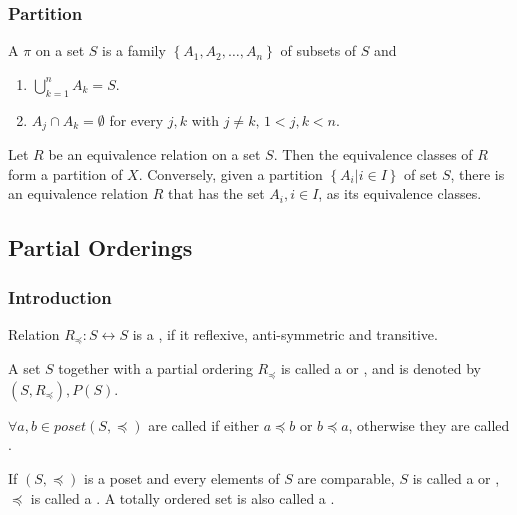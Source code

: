 \subsubsection{Partition}
\begin{definition}
    A  $\pi$ on a set $S$ is a family $\left\{ A_1,A_2,\dots,A_n \right\}$ of subsets of $S$ and 
    \begin{enumerate}
        \item $\displaystyle \bigcup_{k=1}^n A_k=S$.
        \item $\displaystyle A_j\cap A_k=\emptyset$ for every $j,k$ with $j\ne k,\, 1<j,k<n$. 
    \end{enumerate}
\end{definition}
\begin{theorem}
    Let $R$ be an equivalence relation on a set $S$. Then the equivalence classes of $R$ form a partition of $X$. Conversely, given a partition $\left\{A_i|i\in I\right\}$ of set $S$, there is an equivalence relation $R$ that has the set $A_i,i\in I$, as its equivalence classes. 
\end{theorem}

\subsection{Partial Orderings}
\subsubsection{Introduction}
\begin{definition}
    Relation $R_{\preceq }: S\leftrightarrow S$ is a , if it reflexive, anti-symmetric and transitive. 

    A set $S$ together with a partial ordering $R_{\preceq}$ is called a  or , and is denoted by $(S,R_{\preceq}), P(S)$. 
\end{definition}

\begin{definition}
    $\forall a,b\in poset(S,\preceq)$ are called  if either $a\preceq b$ or $b\preceq a$, otherwise they are called .
    
    If $(S,\preceq)$ is a poset and every elements of $S$ are comparable, $S$ is called a  or , $\preceq$ is called a . A totally ordered set is also called a . 
\end{definition}

